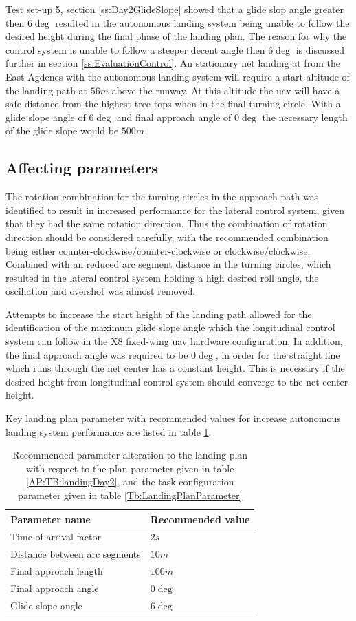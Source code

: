 Test set-up 5, section \ref{ss:Day2GlideSlope} showed that a glide slop angle greater then $6 \deg$ resulted in the autonomous landing system being unable to follow the desired height during the final phase of the landing plan. The reason for why the control system is unable to follow a steeper decent angle then $6 \deg$ is discussed further in section \ref{ss:EvaluationControl}. An stationary net landing at from the East Agdenes with the autonomous landing system will require a start altitude of the landing path at $56 m$ above the runway. At this altitude the \gls{uav} will have a safe distance from the highest tree tops when in the final turning circle. With a glide slope angle of $6 \deg$ and final approach angle of $0 \deg$ the necessary length of the glide slope would be $500 m$.
\subsection{Affecting parameters}
The rotation combination for the turning circles in the approach path was identified to result in increased performance for the lateral control system, given that they had the same rotation direction. Thus the combination of rotation direction should be considered carefully, with the recommended combination being either counter-clockwise/counter-clockwise or clockwise/clockwise. Combined with an reduced arc segment distance in the turning circles, which resulted in the lateral control system holding a high desired roll angle, the oscillation and overshot was almost removed.

Attempts to increase the start height of the landing path allowed for the identification of the maximum glide slope angle which the longitudinal control system can follow in the X8 fixed-wing \gls{uav} hardware configuration. In addition, the final approach angle was required to be $0 \deg$, in order for the straight line which runs through the net center has a constant height. This is necessary if the desired height from longitudinal control system should converge to the net center height.

Key landing plan parameter with recommended values for increase autonomous landing system performance are listed in table \ref{Tb:RecommmendedLandingPlanParameter}.
\begin{table}[H]
\centering
\begin{tabular}{| l | l |}
\hline
\textbf{Parameter name}			&  \textbf{Recommended value} 	\\ \hline
Time of arrival factor			&	$2 s$						\\ \hline
Distance between arc segments	&	$10 m$					 	\\ \hline
Final approach length			&	$100 m$					 	\\ \hline
Final approach angle			&   $0 \deg$					\\ \hline
Glide slope angle				&	$6 \deg$				 	\\ \hline
\end{tabular}
\caption{Recommended parameter alteration to the landing plan with respect to the plan parameter given in table \ref{AP:TB:landingDay2}, and the task configuration parameter given in table \ref{Tb:LandingPlanParameter}}
\label{Tb:RecommmendedLandingPlanParameter}
\end{table}
